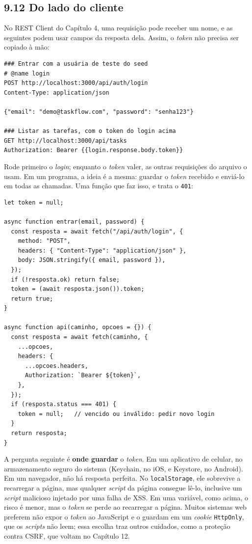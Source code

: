 \subsection{9.12 Do lado do cliente}

No REST Client do Capítulo 4, uma requisição pode receber um nome, e as seguintes podem usar campos da resposta dela. Assim, o \textit{token} não precisa ser copiado à mão:

\begin{codigo}
\begin{Verbatim}[breaklines=true, breaksymbolleft={}, fontsize=\footnotesize]
### Entrar com a usuária de teste do seed
# @name login
POST http://localhost:3000/api/auth/login
Content-Type: application/json

{"email": "demo@taskflow.com", "password": "senha123"}

### Listar as tarefas, com o token do login acima
GET http://localhost:3000/api/tasks
Authorization: Bearer {{login.response.body.token}}
\end{Verbatim}
\end{codigo}

Rode primeiro o \textit{login}; enquanto o \textit{token} valer, as outras requisições do arquivo o usam. Em um programa, a ideia é a mesma: guardar o \textit{token} recebido e enviá-lo em todas as chamadas. Uma função que faz isso, e trata o \texttt{401}:

\begin{codigo}
\begin{Verbatim}[breaklines=true, breaksymbolleft={}, fontsize=\footnotesize]
let token = null;

async function entrar(email, password) {
  const resposta = await fetch("/api/auth/login", {
    method: "POST",
    headers: { "Content-Type": "application/json" },
    body: JSON.stringify({ email, password }),
  });
  if (!resposta.ok) return false;
  token = (await resposta.json()).token;
  return true;
}

async function api(caminho, opcoes = {}) {
  const resposta = await fetch(caminho, {
    ...opcoes,
    headers: {
      ...opcoes.headers,
      Authorization: `Bearer ${token}`,
    },
  });
  if (resposta.status === 401) {
    token = null;   // vencido ou inválido: pedir novo login
  }
  return resposta;
}
\end{Verbatim}
\end{codigo}

A pergunta seguinte é \textbf{onde guardar} o \textit{token}. Em um aplicativo de celular, no armazenamento seguro do sistema (Keychain, no iOS, e Keystore, no Android). Em um navegador, não há resposta perfeita. No \texttt{localStorage}, ele sobrevive a recarregar a página, mas qualquer \textit{script} da página consegue lê-lo, inclusive um \textit{script} malicioso injetado por uma falha de XSS. Em uma variável, como acima, o risco é menor, mas o \textit{token} se perde ao recarregar a página. Muitos sistemas web preferem não expor o \textit{token} ao JavaScript e o guardam em um \textit{cookie} \texttt{HttpOnly}, que os \textit{scripts} não leem; essa escolha traz outros cuidados, como a proteção contra CSRF, que voltam no Capítulo 12.

